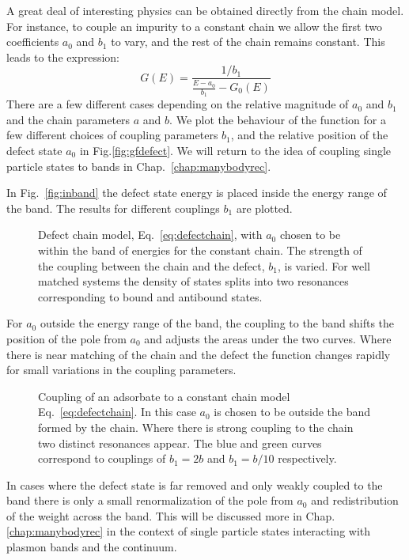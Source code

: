 A great deal of interesting physics can be obtained directly from the chain model. 
For instance, to couple an impurity to a constant chain we allow the first two coefficients $a_{0}$ and $b_{1}$ to vary, 
and the rest of the chain remains constant. This leads to the expression:
%
\begin{equation}
\label{eq:defectchain}
G(E) = \frac{1/b_{1}}{\frac{E-a_{0}}{b_{1}} - G_{0}(E)}
\end{equation}
%
There are a few different cases depending on the relative magnitude of $a_0$ 
and $b_{1}$ and the chain parameters $a$ and $b$.
We plot the behaviour of the function for a few different choices of coupling parameters
$b_{1}$, and the relative position of the defect state $a_0$ in Fig.\ref{fig:gfdefect}. 
We will return to the idea of coupling single particle states to bands in Chap.~\ref{chap:manybodyrec}. 

In Fig.~\ref{fig:inband} the defect state energy is placed inside the energy range of the band. The
results for different couplings $b_{1}$ are plotted.
%
\begin{figure}
\begin{center}
{\graphicspath{{./invariance/chain_figs/}}}
\caption{Defect chain model, Eq.~\ref{eq:defectchain}, with $a_{0}$ chosen to be 
within the band of energies for the constant chain. The strength of the coupling between the chain 
and the defect, $b_1$, is varied. For well matched systems the density of states splits 
into two resonances corresponding to bound and antibound states. \label{fig:impurity}}
\end{center}
\end{figure}
%

For $a_{0}$ outside the energy range of the band, the coupling to the band shifts the position
of the pole from $a_{0}$ and adjusts the areas under the two curves. Where there is 
near matching of the chain and the defect the function changes rapidly for small
variations in the coupling parameters.
%
\begin{figure}
\begin{center}
{\graphicspath{{./invariance/chain_figs/}}}
\caption{Coupling of an adsorbate to a constant chain model Eq.~\ref{eq:defectchain}. 
In this case $a_{0}$ is chosen to be outside the band formed by the chain.
Where there is strong coupling to the chain two distinct resonances appear.
The blue and green curves correspond to couplings of $b_{1}=2b$ and $b_{1}=b/10$ respectively.
\label{fig:gfconstchain}}
\end{center}
\end{figure}
%
In cases where the defect state is far removed and only weakly coupled to the band
there is only a small renormalization of the pole from $a_{0}$ and redistribution of the weight across the band.
This will be discussed more in Chap.\ref{chap:manybodyrec} in the context of single particle states
interacting with plasmon bands and the continuum.

